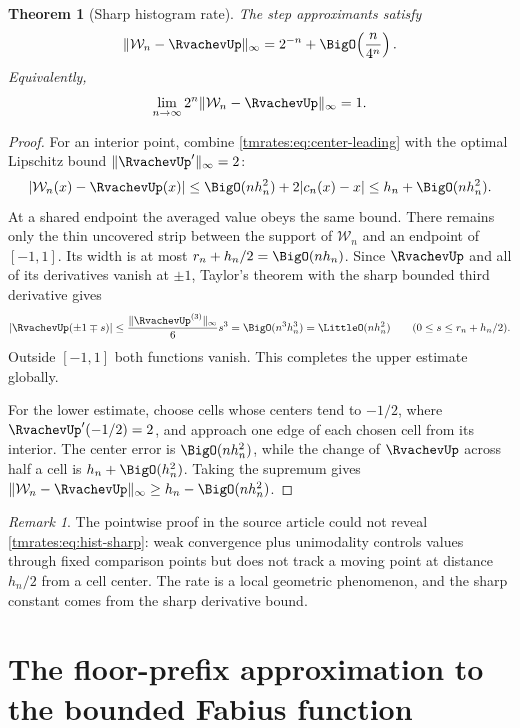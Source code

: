 \documentclass[11pt,oneside]{article}
\newtheorem{theorem}{Theorem}[section]
\theoremstyle{definition}
\theoremstyle{remark}
\newtheorem{remark}[remark]{Remark}
\begin{document}
\begin{theorem}[Sharp histogram rate]
\label{tmrates:thm:hist-sharp}
The step approximants satisfy
\begin{equation}
 \|\mathcal W_n-\RvachevUp\|_\infty
 =2^{-n}+\BigO\!\left(\frac n{4^n}\right).                \label{tmrates:eq:hist-sharp}
\end{equation}
Equivalently,
\begin{equation}
 \lim_{n\to\infty}2^n\|\mathcal W_n-\RvachevUp\|_\infty=1.      \label{tmrates:eq:hist-limit-constant}
\end{equation}
\end{theorem}

\begin{proof}
For an interior point, combine \eqref{tmrates:eq:center-leading} with the optimal Lipschitz bound
$\|\RvachevUp'\|_\infty=2$:
\[
 |\mathcal W_n(x)-\RvachevUp(x)|
 \le \BigO(nh_n^2)+2|c_n(x)-x|
 \le h_n+\BigO(nh_n^2).
\]
At a shared endpoint the averaged value obeys the same bound.  There remains only the thin
uncovered strip between the support of $\mathcal W_n$ and an endpoint of $[-1,1]$.
Its width is at most $r_n+h_n/2=\BigO(nh_n)$.  Since $\RvachevUp$ and all of its
derivatives vanish at $\pm1$, Taylor's theorem with the sharp bounded third derivative gives
\[
 |\RvachevUp(\pm1\mp s)|\le \frac{\|\RvachevUp^{(3)}\|_\infty}{6}s^3
 =\BigO(n^3h_n^3)=\LittleO(nh_n^2)
 \qquad(0\le s\le r_n+h_n/2).
\]
Outside $[-1,1]$ both functions vanish.  This completes the upper estimate globally.

For the lower estimate, choose cells whose centers tend to $-1/2$, where
$\RvachevUp'(-1/2)=2$, and approach one edge of each chosen cell from its interior.  The center error
is $\BigO(nh_n^2)$, while the change of $\RvachevUp$ across half a cell is
$h_n+\BigO(h_n^2)$.  Taking the supremum gives
$\|\mathcal W_n-\RvachevUp\|_\infty\ge h_n-\BigO(nh_n^2)$.
\end{proof}

\begin{remark}
The pointwise proof in the source article could not reveal \eqref{tmrates:eq:hist-sharp}: weak
convergence plus unimodality controls values through fixed comparison points but does not
track a moving point at distance $h_n/2$ from a cell center.  The rate is a local geometric
phenomenon, and the sharp constant comes from the sharp derivative bound.
\end{remark}

\section{The floor-prefix approximation to the bounded Fabius function}
\label{tmrates:sec:floor-rate}
\end{document}
